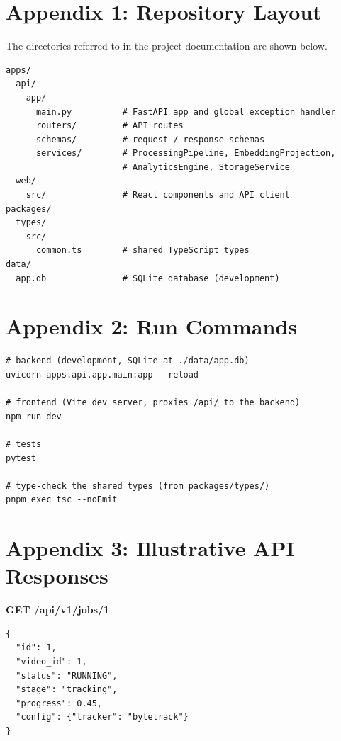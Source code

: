 \clearpage
\chapter*{Appendix 1: Repository Layout}

The directories referred to in the project documentation are shown below.

\begin{lstlisting}[style=plain]
apps/
  api/
    app/
      main.py          # FastAPI app and global exception handler
      routers/         # API routes
      schemas/         # request / response schemas
      services/        # ProcessingPipeline, EmbeddingProjection,
                       # AnalyticsEngine, StorageService
  web/
    src/               # React components and API client
packages/
  types/
    src/
      common.ts        # shared TypeScript types
data/
  app.db               # SQLite database (development)
\end{lstlisting}

\chapter*{Appendix 2: Run Commands}

\begin{lstlisting}[style=plain]
# backend (development, SQLite at ./data/app.db)
uvicorn apps.api.app.main:app --reload

# frontend (Vite dev server, proxies /api/ to the backend)
npm run dev

# tests
pytest

# type-check the shared types (from packages/types/)
pnpm exec tsc --noEmit
\end{lstlisting}

\chapter*{Appendix 3: Illustrative API Responses}


\textbf{GET /api/v1/jobs/1}
\begin{lstlisting}[style=added]
{
  "id": 1,
  "video_id": 1,
  "status": "RUNNING",
  "stage": "tracking",
  "progress": 0.45,
  "config": {"tracker": "bytetrack"}
}
\end{lstlisting}


